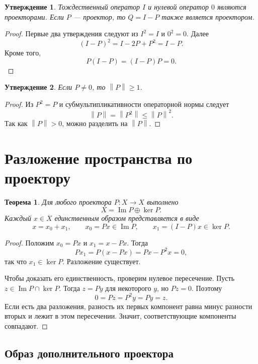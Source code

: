 \documentclass[12pt,a4paper]{article}
\newtheorem{theorem}{Теорема}
\newtheorem{proposition}{Утверждение}
\theoremstyle{definition}
\theoremstyle{remark}
\newcommand{\norm}[1]{\left\lVert #1\right\rVert}
\begin{document}
\begin{proposition}
Тождественный оператор $I$ и нулевой оператор $0$ являются проекторами.
Если $P$ --- проектор, то $Q=I-P$ также является проектором.
\end{proposition}

\begin{proof}
Первые два утверждения следуют из $I^2=I$ и $0^2=0$. Далее
\[
  (I-P)^2=I-2P+P^2=I-P.
\]
Кроме того,
\[
  P(I-P)=(I-P)P=0.
\]
\end{proof}

\begin{proposition}
Если $P\ne0$, то $\norm{P}\geqslant1$.
\end{proposition}

\begin{proof}
Из $P^2=P$ и субмультипликативности операторной нормы следует
\[
  \norm{P}=\norm{P^2}\leqslant\norm{P}^2.
\]
Так как $\norm{P}>0$, можно разделить на $\norm{P}$.
\end{proof}

\section{Разложение пространства по проектору}

\begin{theorem}
Для любого проектора $P\colon X\to X$ выполнено
\[
  \boxed{X=\operatorname{Im}P\oplus\ker P}.
\]
Каждый $x\in X$ единственным образом представляется в виде
\[
  x=x_0+x_1,\qquad x_0=Px\in\operatorname{Im}P,\qquad
  x_1=(I-P)x\in\ker P.
\]
\end{theorem}

\begin{proof}
Положим $x_0=Px$ и $x_1=x-Px$. Тогда
\[
  Px_1=P(x-Px)=Px-P^2x=0,
\]
так что $x_1\in\ker P$. Разложение существует.

Чтобы доказать его единственность, проверим нулевое пересечение.
Пусть $z\in\operatorname{Im}P\cap\ker P$. Тогда $z=Py$ для
некоторого $y$, но $Pz=0$. Поэтому
\[
  0=Pz=P^2y=Py=z.
\]
Если есть два разложения, разность их первых компонент равна
минус разности вторых и лежит в этом пересечении. Значит,
соответствующие компоненты совпадают.
\end{proof}

\subsection{Образ дополнительного проектора}
\end{document}
